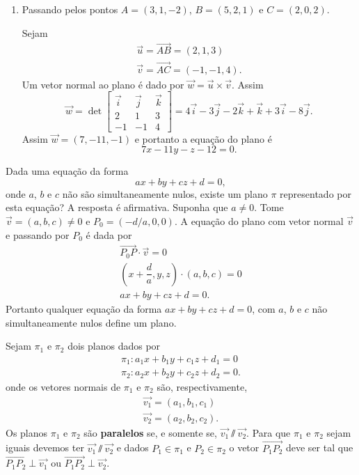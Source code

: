 \begin{exemplos}
\begin{enumerate}
        \item Passando pelos pontos $A = (3,1,-2)$, $B = (5,2,1)$ e $C = (2,0,2)$.
        \begin{solucao}
            Sejam
            \begin{align*}
                \vec{u} = \vec{AB} = (2,1,3)\\
                \vec{v} = \vec{AC} = (-1,-1,4).
            \end{align*}
            Um vetor normal ao plano \'e dado por $\vec{w} = \vec{u}\times\vec{v}$. Assim
            \[
                \vec{w} = \det \begin{bmatrix}
                    \vec{i} & \vec{j} & \vec{k}\\
                    2 & 1 & 3\\
                    -1 & -1 & 4
                \end{bmatrix} = 4\vec{i} - 3\vec{j} - 2\vec{k} + \vec{k} + 3\vec{i} - 8\vec{j}.
            \]
            Assim $\vec{w} = (7,-11,-1)$ e portanto a equa\c{c}\~ao do plano \'e
            \[
                7x - 11y - z - 12 = 0.
            \]
        \end{solucao}
    \end{enumerate}
\end{exemplos}

Dada uma equa\c{c}\~ao da forma
    \[
        ax + by + cz + d = 0,
    \]
onde $a$, $b$ e $c$ n\~ao s\~ao simultaneamente nulos, existe um plano $\pi$ representado por esta equa\c{c}\~ao? A resposta \'e afirmativa. Suponha que $a \ne 0$. Tome $\vec{v} = (a,b,c) \ne 0$ e $P_0 = (-d/a,0,0)$. A equa\c{c}\~ao do plano com vetor normal $\vec{v}$ e passando por $P_0$ \'e dada por
    \begin{align*}
        \vec{P_0P}\cdot\vec{v} = 0\\
        \left(x + \dfrac{d}{a},y,z\right)\cdot(a,b,c) = 0\\
        ax + by + cz + d = 0.
    \end{align*}
Portanto qualquer equa\c{c}\~ao da forma $ax + by + cz + d = 0$, com $a$, $b$ e $c$ n\~ao simultaneamente nulos define um plano.

Sejam $\pi_1$ e $\pi_2$ dois planos dados por
    \begin{align*}
        \pi_1 : a_1x + b_1y + c_1z + d_1 = 0\\
        \pi_2 : a_2x + b_2y + c_2z + d_2 = 0.
    \end{align*}
onde os vetores normais de $\pi_1$ e $\pi_2$ s\~ao, respectivamente,
    \begin{align*}
        \vec{v_1} = (a_1, b_1, c_1)\\
        \vec{v_2} = (a_2, b_2, c_2).
    \end{align*}
Os planos $\pi_1$ e $\pi_2$ s\~ao \textbf{paralelos} se, e somente se, $\vec{v_1} \varparallel\vec{v_2}$. Para que $\pi_1$ e $\pi_2$ sejam iguais devemos ter $\vec{v_1}\varparallel\vec{v_2}$  e dados $P_1\in\pi_1$ e $P_2\in\pi_2$ o vetor $\vec{P_1P_2}$ deve ser tal que $\vec{P_1P_2}\perp\vec{v_1}$ ou $\vec{P_1P_2}\perp\vec{v_2}$.

